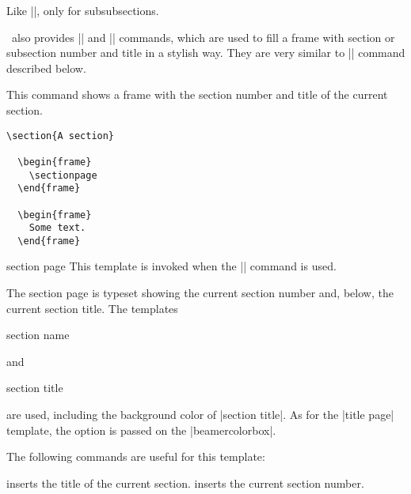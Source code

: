 \begin{command}{\AtBeginSubsubsection{}}
  Like |\AtBeginSubsection|, only for subsubsections.
\end{command}

\beamer\ also provides |\sectionpage| and |\subsectionpage| commands, which are used to fill a frame with section or subsection number and title in a stylish way. They are very similar to |\partpage| command described below.

\begin{command}{\sectionpage}
	This command shows a frame with the section number and title of the current section.
  \example
\begin{verbatim}
\section{A section}

  \begin{frame}
    \sectionpage
  \end{frame}

  \begin{frame}
    Some text.
  \end{frame}
\end{verbatim}

  \begin{element}{section page}\yes\no\no
    This template is invoked when the |\sectionpage| command is used.

    \begin{templateoptions}
      The section page is typeset showing the current section number and, below, the current section title. The templates
      \begin{element}{section name}\no\yes\yes
      \end{element}
      and
      \begin{element}{section title}\no\yes\yes
      \end{element}
      are used, including the background color of |section title|. As for the |title page| template, the  option is passed on the |beamercolorbox|.
    \end{templateoptions}

    The following commands are useful for this template:
    \begin{templateinserts}
      \iteminsert{\insertsection}
      inserts the title of the current section.
      \iteminsert{\insertsectionnumber}
      inserts the current section number.
    \end{templateinserts}
  \end{element}
\end{command}

